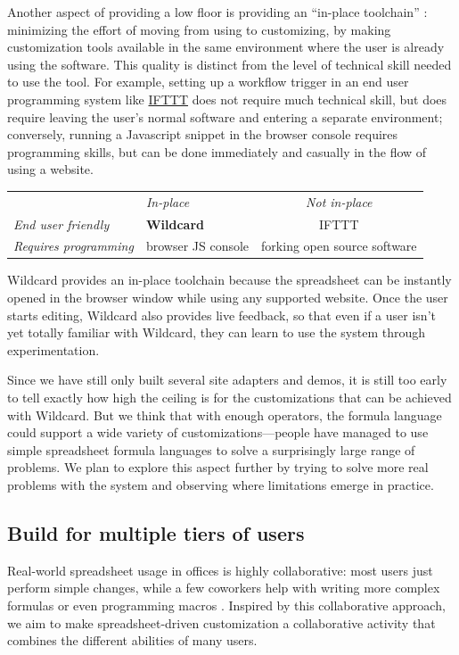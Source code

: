 \documentclass[english,submission]{programming}
\begin{document}
Another aspect of providing a low floor is providing an ``in-place
toolchain'' \autocite{inkandswitch2019}: minimizing the effort of moving
from using to customizing, by making customization tools available in
the same environment where the user is already using the software. This
quality is distinct from the level of technical skill needed to use the
tool. For example, setting up a workflow trigger in an end user
programming system like \href{https://ifttt.com/}{IFTTT} does not
require much technical skill, but does require leaving the user's normal
software and entering a separate environment; conversely, running a
Javascript snippet in the browser console requires programming skills,
but can be done immediately and casually in the flow of using a website.

\begin{longtable}[]{@{}llc@{}}
\toprule
\endhead
& \emph{In-place} & \emph{Not in-place}\tabularnewline
\emph{End user friendly} & \textbf{Wildcard} & IFTTT\tabularnewline
\emph{Requires programming} & browser JS console & forking open source
software\tabularnewline
\bottomrule
\end{longtable}

Wildcard provides an in-place toolchain because the spreadsheet can be
instantly opened in the browser window while using any supported
website. Once the user starts editing, Wildcard also provides live
feedback, so that even if a user isn't yet totally familiar with
Wildcard, they can learn to use the system through experimentation.

Since we have still only built several site adapters and demos, it is
still too early to tell exactly how high the ceiling is for the
customizations that can be achieved with Wildcard. But we think that
with enough operators, the formula language could support a wide variety
of customizations---people have managed to use simple spreadsheet
formula languages to solve a surprisingly large range of problems. We
plan to explore this aspect further by trying to solve more real
problems with the system and observing where limitations emerge in
practice.

\hypertarget{build-for-multiple-tiers-of-users}{%
\subsection{Build for multiple tiers of
users}\label{build-for-multiple-tiers-of-users}}

Real-world spreadsheet usage in offices is highly collaborative: most
users just perform simple changes, while a few coworkers help with
writing more complex formulas or even programming macros
\autocite{nardi1990}. Inspired by this collaborative approach, we aim to
make spreadsheet-driven customization a collaborative activity that
combines the different abilities of many users.
\end{document}
